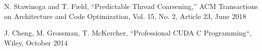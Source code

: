 \documentclass[12pt, a4paper, oneside]{Thesis} %
\begin{document}

%
%
%


\backmatter

\label{Bibliography}

\begin{thebibliography}{00}
 N. Stawinoga and T. Field, ``Predictable Thread Coarsening,'' ACM Transactions on Architecture and Code Optimization, Vol. 15, No. 2, Article 23, June 2018

 J. Cheng, M. Grossman, T. McKercher, ``Professional CUDA C Programming``, Wiley, October 2014



\end{thebibliography}
\end{document}
